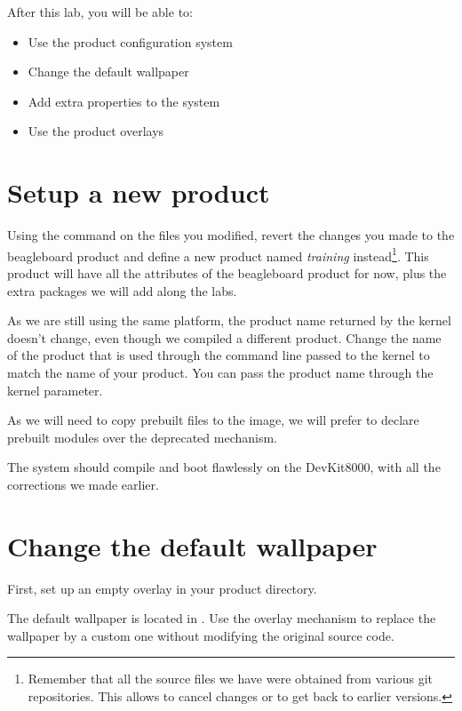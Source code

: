 
After this lab, you will be able to:
\begin{itemize}
  \item Use the product configuration system
  \item Change the default wallpaper
  \item Add extra properties to the system
  \item Use the product overlays
\end{itemize}

\section{Setup a new product}

Using the  command on the files you modified,
revert the changes you made to the beagleboard product and define
a new product named \textit{training} instead\footnote{Remember
that all the source files we have were obtained from various git
repositories. This allows to cancel changes or to get back to
earlier versions.}.  This product will have all the
attributes of the beagleboard product for now, plus the extra packages
we will add along the labs.

As we are still using the same platform, the product name returned by the
kernel doesn't change, even though we compiled a different product. Change
the name of the product that is used through the command line passed to the
kernel to match the name of your product. You can pass the product name through
the  kernel parameter.

As we will need to copy prebuilt files to the image, we will prefer to
declare prebuilt modules over the deprecated 
mechanism.

The system should compile and boot flawlessly on the DevKit8000, with all the
corrections we made earlier.

\section{Change the default wallpaper}

First, set up an empty overlay in your product directory.

The default wallpaper is located in .
Use the overlay mechanism to replace the wallpaper by a custom one without
modifying the original source code.
